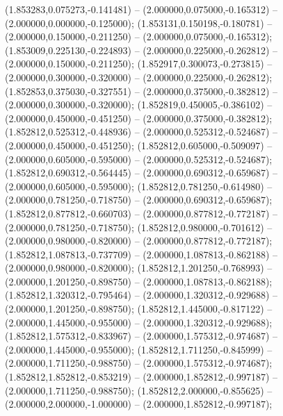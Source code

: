  (1.853283,0.075273,-0.141481) -- (2.000000,0.075000,-0.165312) -- (2.000000,0.000000,-0.125000);
 (1.853131,0.150198,-0.180781) -- (2.000000,0.150000,-0.211250) -- (2.000000,0.075000,-0.165312);
 (1.853009,0.225130,-0.224893) -- (2.000000,0.225000,-0.262812) -- (2.000000,0.150000,-0.211250);
 (1.852917,0.300073,-0.273815) -- (2.000000,0.300000,-0.320000) -- (2.000000,0.225000,-0.262812);
 (1.852853,0.375030,-0.327551) -- (2.000000,0.375000,-0.382812) -- (2.000000,0.300000,-0.320000);
 (1.852819,0.450005,-0.386102) -- (2.000000,0.450000,-0.451250) -- (2.000000,0.375000,-0.382812);
 (1.852812,0.525312,-0.448936) -- (2.000000,0.525312,-0.524687) -- (2.000000,0.450000,-0.451250);
 (1.852812,0.605000,-0.509097) -- (2.000000,0.605000,-0.595000) -- (2.000000,0.525312,-0.524687);
 (1.852812,0.690312,-0.564445) -- (2.000000,0.690312,-0.659687) -- (2.000000,0.605000,-0.595000);
 (1.852812,0.781250,-0.614980) -- (2.000000,0.781250,-0.718750) -- (2.000000,0.690312,-0.659687);
 (1.852812,0.877812,-0.660703) -- (2.000000,0.877812,-0.772187) -- (2.000000,0.781250,-0.718750);
 (1.852812,0.980000,-0.701612) -- (2.000000,0.980000,-0.820000) -- (2.000000,0.877812,-0.772187);
 (1.852812,1.087813,-0.737709) -- (2.000000,1.087813,-0.862188) -- (2.000000,0.980000,-0.820000);
 (1.852812,1.201250,-0.768993) -- (2.000000,1.201250,-0.898750) -- (2.000000,1.087813,-0.862188);
 (1.852812,1.320312,-0.795464) -- (2.000000,1.320312,-0.929688) -- (2.000000,1.201250,-0.898750);
 (1.852812,1.445000,-0.817122) -- (2.000000,1.445000,-0.955000) -- (2.000000,1.320312,-0.929688);
 (1.852812,1.575312,-0.833967) -- (2.000000,1.575312,-0.974687) -- (2.000000,1.445000,-0.955000);
 (1.852812,1.711250,-0.845999) -- (2.000000,1.711250,-0.988750) -- (2.000000,1.575312,-0.974687);
 (1.852812,1.852812,-0.853219) -- (2.000000,1.852812,-0.997187) -- (2.000000,1.711250,-0.988750);
 (1.852812,2.000000,-0.855625) -- (2.000000,2.000000,-1.000000) -- (2.000000,1.852812,-0.997187);
